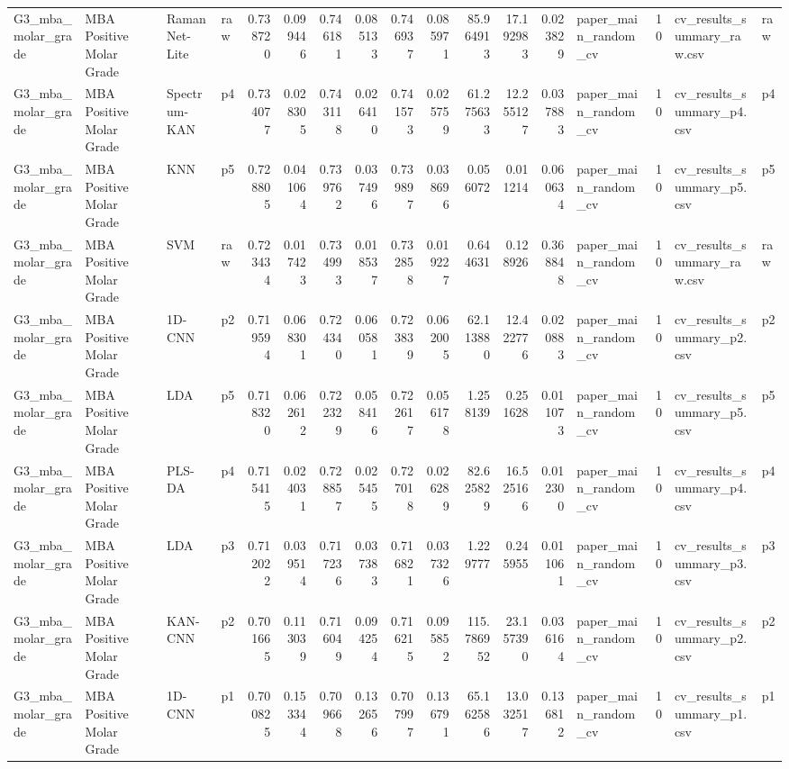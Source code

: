 \begin{tabular}{llllrrrrrrrrrlrll}
G3_mba_molar_grade & MBA Positive Molar Grade & RamanNet-Lite & raw & 0.738720 & 0.099446 & 0.746181 & 0.085133 & 0.746937 & 0.085971 & 85.964913 & 17.192983 & 0.023829 & paper_main_random_cv & 10 & cv_results_summary_raw.csv & raw \\
G3_mba_molar_grade & MBA Positive Molar Grade & Spectrum-KAN & p4 & 0.734077 & 0.028305 & 0.743118 & 0.026410 & 0.741573 & 0.025759 & 61.275633 & 12.255127 & 0.037883 & paper_main_random_cv & 10 & cv_results_summary_p4.csv & p4 \\
G3_mba_molar_grade & MBA Positive Molar Grade & KNN & p5 & 0.728805 & 0.041064 & 0.739762 & 0.037496 & 0.739897 & 0.038696 & 0.056072 & 0.011214 & 0.060634 & paper_main_random_cv & 10 & cv_results_summary_p5.csv & p5 \\
G3_mba_molar_grade & MBA Positive Molar Grade & SVM & raw & 0.723434 & 0.017423 & 0.734993 & 0.018537 & 0.732858 & 0.019227 & 0.644631 & 0.128926 & 0.368848 & paper_main_random_cv & 10 & cv_results_summary_raw.csv & raw \\
G3_mba_molar_grade & MBA Positive Molar Grade & 1D-CNN & p2 & 0.719594 & 0.068301 & 0.724340 & 0.060581 & 0.723839 & 0.062005 & 62.113880 & 12.422776 & 0.020883 & paper_main_random_cv & 10 & cv_results_summary_p2.csv & p2 \\
G3_mba_molar_grade & MBA Positive Molar Grade & LDA & p5 & 0.718320 & 0.062612 & 0.722329 & 0.058416 & 0.722617 & 0.056178 & 1.258139 & 0.251628 & 0.011073 & paper_main_random_cv & 10 & cv_results_summary_p5.csv & p5 \\
G3_mba_molar_grade & MBA Positive Molar Grade & PLS-DA & p4 & 0.715415 & 0.024031 & 0.728857 & 0.025455 & 0.727018 & 0.026289 & 82.625829 & 16.525166 & 0.012300 & paper_main_random_cv & 10 & cv_results_summary_p4.csv & p4 \\
G3_mba_molar_grade & MBA Positive Molar Grade & LDA & p3 & 0.712022 & 0.039514 & 0.717236 & 0.037383 & 0.716821 & 0.037326 & 1.229777 & 0.245955 & 0.011061 & paper_main_random_cv & 10 & cv_results_summary_p3.csv & p3 \\
G3_mba_molar_grade & MBA Positive Molar Grade & KAN-CNN & p2 & 0.701665 & 0.113039 & 0.716049 & 0.094254 & 0.716215 & 0.095852 & 115.786952 & 23.157390 & 0.036164 & paper_main_random_cv & 10 & cv_results_summary_p2.csv & p2 \\
G3_mba_molar_grade & MBA Positive Molar Grade & 1D-CNN & p1 & 0.700825 & 0.153344 & 0.709668 & 0.132656 & 0.707997 & 0.136791 & 65.162586 & 13.032517 & 0.136812 & paper_main_random_cv & 10 & cv_results_summary_p1.csv & p1 \\

\end{tabular}
